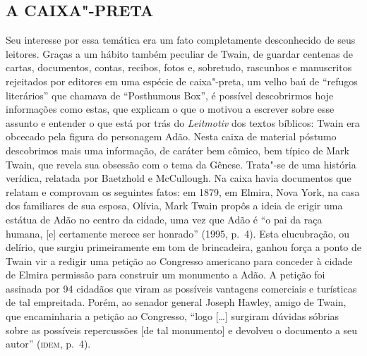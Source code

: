 \subsection{A CAIXA"-PRETA}

Seu interesse por essa temática era um fato completamente desconhecido de
seus leitores. Graças a um hábito também peculiar de Twain, de guardar
centenas de cartas, documentos, contas, recibos, fotos e, sobretudo,
rascunhos e manuscritos rejeitados por editores em uma espécie de 
caixa"-preta, um velho baú de ``refugos literários''
que chamava de ``Posthumous Box'', é
possível descobrirmos hoje informações como estas, que explicam o que o
motivou a escrever sobre esse assunto e entender o que está por trás do 
\textit{Leitmotiv} dos textos bíblicos: Twain era obcecado pela figura do
personagem Adão. Nesta caixa de material póstumo descobrimos mais uma
informação, de caráter bem cômico, bem típico de Mark Twain, que revela
sua obsessão com o tema da Gênese. Trata"-se de uma história verídica,
relatada por Baetzhold e McCullough. Na caixa havia documentos que relatam
e comprovam os seguintes fatos: em 1879, em Elmira, Nova York, na casa
dos familiares de sua esposa, Olívia, Mark Twain propôs a ideia de erigir
uma estátua de Adão no centro da cidade, uma vez que Adão é “o pai da raça
humana, [e] certamente merece ser honrado” (1995, p.~4). Esta elucubração,
ou delírio, que surgiu primeiramente em tom de brincadeira, ganhou força
a ponto de Twain vir a redigir uma petição ao Congresso americano
para conceder à cidade de Elmira permissão para construir um monumento
a Adão. A petição foi assinada por 94 cidadãos que viram
as possíveis vantagens comerciais e turísticas de tal empreitada. Porém,
ao senador general Joseph Hawley, amigo de Twain, que encaminharia a
petição ao Congresso, ``logo [\ldots{}] surgiram dúvidas sóbrias sobre as
possíveis repercussões [de tal monumento] e devolveu o documento a seu
autor'' (\textsc{idem}, p.~4).

